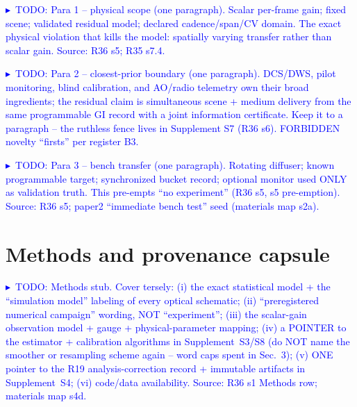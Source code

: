 \documentclass[10pt,twocolumn]{article}
\newcommand{\TODOc}[1]{\par\smallskip\noindent\textcolor{blue}{\footnotesize$\blacktriangleright$~TODO: #1}\par\smallskip}
\begin{document}
\TODOc{Para 1 -- physical scope (one paragraph). Scalar per-frame gain; fixed
scene; validated residual model; declared cadence/span/CV domain. The exact
physical violation that kills the model: spatially varying transfer rather than
scalar gain. Source: R36 s5; R35 s7.4.}

\TODOc{Para 2 -- closest-prior boundary (one paragraph). DCS/DWS, pilot
monitoring, blind calibration, and AO/radio telemetry own their broad
ingredients; the residual claim is simultaneous scene + medium delivery from the
same programmable GI record with a joint information certificate. Keep it to a
paragraph -- the ruthless fence lives in Supplement S7 (R36 s6). FORBIDDEN novelty
``firsts'' per register B3.}

\TODOc{Para 3 -- bench transfer (one paragraph). Rotating diffuser; known
programmable target; synchronized bucket record; optional monitor used ONLY as
validation truth. This pre-empts ``no experiment'' (R36 s5, s5 pre-emption).
Source: R36 s5; paper2 ``immediate bench test'' seed (materials map s2a).}


\section*{Methods and provenance capsule}
\label{sec:methods}

\TODOc{Methods stub. Cover tersely: (i) the exact statistical model + the
``simulation model'' labeling of every optical schematic; (ii) ``preregistered
numerical campaign'' wording, NOT ``experiment''; (iii) the scalar-gain
observation model + gauge + physical-parameter mapping; (iv) a POINTER to the
estimator + calibration algorithms in Supplement~S3/S8 (do NOT name the smoother
or resampling scheme again -- word caps spent in Sec.~3); (v) ONE pointer to the
R19 analysis-correction record + immutable artifacts in Supplement~S4; (vi)
code/data availability. Source: R36 s1 Methods row; materials map s4d.}
\end{document}
